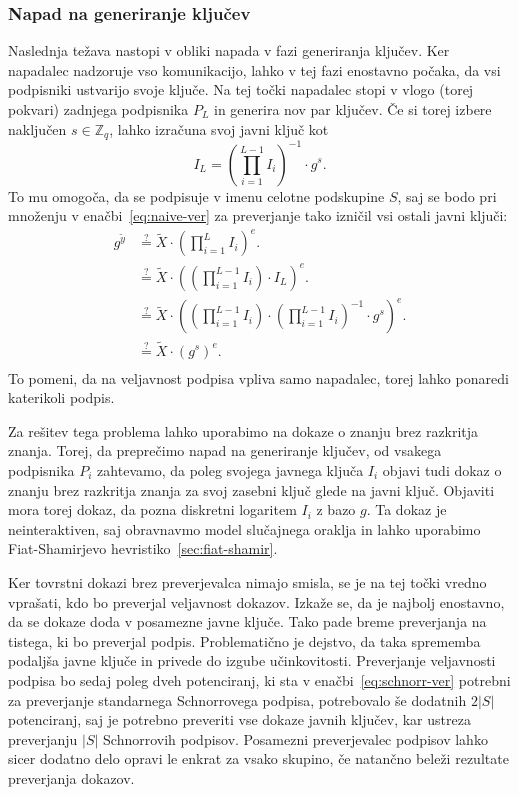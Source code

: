 \documentclass[isrm2, tisk]{fmfdelo}
\newcommand{\Z}{\mathbb Z}
\begin{document}
\subsubsection{Napad na generiranje ključev}
Naslednja težava nastopi v obliki napada v fazi generiranja ključev. Ker napadalec nadzoruje vso
komunikacijo, lahko v tej fazi enostavno počaka, da vsi podpisniki ustvarijo svoje ključe. Na tej
točki napadalec stopi v vlogo (torej pokvari) zadnjega podpisnika $P_L$ in generira nov par ključev.
Če si torej izbere naključen $s \in \Z_q$, lahko izračuna svoj javni ključ kot
$$
I_L = \left( \prod_{i=1}^{L-1} I_i \right)^{-1} \cdot g^s.
$$
To mu omogoča, da se podpisuje v imenu celotne podskupine $S$, saj se bodo pri množenju v
enačbi~\eqref{eq:naive-ver} za preverjanje tako izničil vsi ostali javni ključi:
\begin{align*}
    g^{\tilde{y}} &\stackrel{?}{=} \tilde{X} \cdot \left(\prod_{i=1}^L I_i \right)^{e}. \\
                   &\stackrel{?}{=} \tilde{X} \cdot \left(\left(\prod_{i=1}^{L-1} I_i \right) \cdot I_L \right)^{e}. \\
                   &\stackrel{?}{=} \tilde{X} \cdot \left(\left(\prod_{i=1}^{L-1} I_i \right) \cdot \left( \prod_{i=1}^{L-1} I_i \right)^{-1} \cdot g^s \right)^{e}. \\
                   &\stackrel{?}{=} \tilde{X} \cdot \left( g^s \right)^{e}. \\
\end{align*}
To pomeni, da na veljavnost podpisa vpliva samo napadalec, torej lahko ponaredi katerikoli podpis.

Za rešitev tega problema lahko uporabimo na dokaze o znanju brez razkritja znanja. Torej, da
preprečimo napad na generiranje ključev, od vsakega podpisnika $P_i$ zahtevamo, da poleg svojega
javnega ključa $I_i$ objavi tudi dokaz o znanju brez razkritja znanja za svoj zasebni ključ glede na
javni ključ. Objaviti mora torej dokaz, da pozna diskretni logaritem $I_i$ z bazo $g$. Ta dokaz je
neinteraktiven, saj obravnavmo model slučajnega oraklja in lahko uporabimo Fiat-Shamirjevo
hevristiko~\ref{sec:fiat-shamir}.

Ker tovrstni dokazi brez preverjevalca nimajo smisla, se je na tej točki vredno vprašati, kdo bo preverjal
veljavnost dokazov. Izkaže se, da je najbolj enostavno, da se dokaze doda v posamezne javne ključe.
Tako pade breme preverjanja na tistega, ki bo preverjal podpis. Problematično je dejstvo, da taka
sprememba podaljša javne ključe in privede do izgube učinkovitosti. Preverjanje veljavnosti podpisa
bo sedaj poleg dveh potenciranj, ki sta v enačbi~\eqref{eq:schnorr-ver} potrebni za preverjanje
standarnega Schnorrovega podpisa, potrebovalo še dodatnih $2|S|$ potenciranj, saj je potrebno
preveriti vse dokaze javnih ključev, kar ustreza preverjanju $|S|$ Schnorrovih podpisov. Posamezni
preverjevalec podpisov lahko sicer dodatno delo opravi le enkrat za vsako skupino, če natančno beleži
rezultate preverjanja dokazov.
\end{document}
